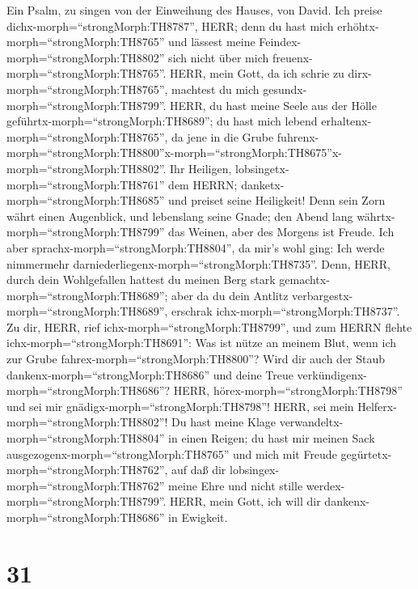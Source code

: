  Ein Psalm, zu singen von der Einweihung des Hauses, von
David. Ich preise dichx-morph=``strongMorph:TH8787'', HERR; denn du hast
mich erhöhtx-morph=``strongMorph:TH8765'' und lässest meine
Feindex-morph=``strongMorph:TH8802'' sich nicht über mich
freuenx-morph=``strongMorph:TH8765''.  HERR, mein Gott, da
ich schrie zu dirx-morph=``strongMorph:TH8765'', machtest du mich
gesundx-morph=``strongMorph:TH8799''.  HERR, du hast meine
Seele aus der Hölle geführtx-morph=``strongMorph:TH8689''; du hast mich
lebend erhaltenx-morph=``strongMorph:TH8765'', da jene in die Grube
fuhrenx-morph=``strongMorph:TH8800''\textbar x-morph=``strongMorph:TH8675''x-morph=``strongMorph:TH8802''.
 Ihr Heiligen, lobsingetx-morph=``strongMorph:TH8761'' dem
HERRN; danketx-morph=``strongMorph:TH8685'' und preiset seine
Heiligkeit!  Denn sein Zorn währt einen Augenblick, und
lebenslang seine Gnade; den Abend lang
währtx-morph=``strongMorph:TH8799'' das Weinen, aber des Morgens ist
Freude.  Ich aber sprachx-morph=``strongMorph:TH8804'', da
mir's wohl ging: Ich werde nimmermehr
darniederliegenx-morph=``strongMorph:TH8735''.  Denn, HERR,
durch dein Wohlgefallen hattest du meinen Berg stark
gemachtx-morph=``strongMorph:TH8689''; aber da du dein Antlitz
verbargestx-morph=``strongMorph:TH8689'', erschrak
ichx-morph=``strongMorph:TH8737''.  Zu dir, HERR, rief
ichx-morph=``strongMorph:TH8799'', und zum HERRN flehte
ichx-morph=``strongMorph:TH8691'':  Was ist nütze an meinem
Blut, wenn ich zur Grube fahrex-morph=``strongMorph:TH8800''? Wird dir
auch der Staub dankenx-morph=``strongMorph:TH8686'' und deine Treue
verkündigenx-morph=``strongMorph:TH8686''?  HERR,
hörex-morph=``strongMorph:TH8798'' und sei mir
gnädigx-morph=``strongMorph:TH8798''! HERR, sei mein
Helferx-morph=``strongMorph:TH8802''!  Du hast meine Klage
verwandeltx-morph=``strongMorph:TH8804'' in einen Reigen; du hast mir
meinen Sack ausgezogenx-morph=``strongMorph:TH8765'' und mich mit Freude
gegürtetx-morph=``strongMorph:TH8762'',  auf daß dir
lobsingex-morph=``strongMorph:TH8762'' meine Ehre und nicht stille
werdex-morph=``strongMorph:TH8799''. HERR, mein Gott, ich will dir
dankenx-morph=``strongMorph:TH8686'' in Ewigkeit.

\hypertarget{section-30}{%
\section{31}\label{section-30}}

